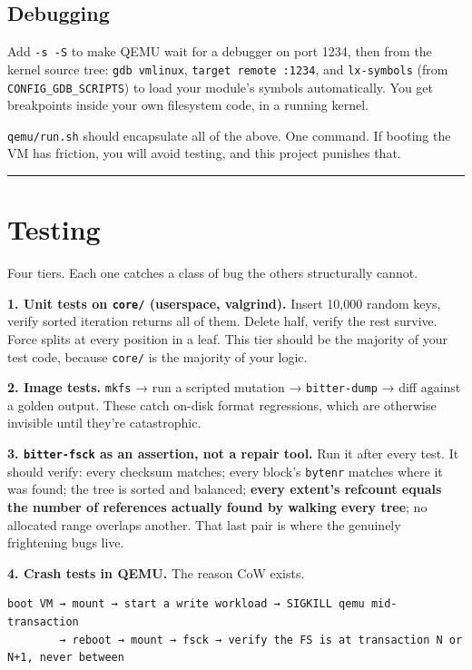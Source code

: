 \hypertarget{debugging}{%
\subsection{Debugging}\label{debugging}}

Add \texttt{-s\ -S} to make QEMU wait for a debugger on port 1234, then from the kernel source
tree: \texttt{gdb\ vmlinux}, \texttt{target\ remote\ :1234}, and \texttt{lx-symbols} (from \texttt{CONFIG\_GDB\_SCRIPTS})
to load your module's symbols automatically. You get breakpoints inside your own
filesystem code, in a running kernel.

\texttt{qemu/run.sh} should encapsulate all of the above. One command. If booting the VM has
friction, you will avoid testing, and this project punishes that.

\begin{center}\rule{0.5\linewidth}{0.5pt}\end{center}

\hypertarget{testing}{%
\section{Testing}\label{testing}}

Four tiers. Each one catches a class of bug the others structurally cannot.

\textbf{1. Unit tests on \texttt{core/} (userspace, valgrind).} Insert 10,000 random keys, verify
sorted iteration returns all of them. Delete half, verify the rest survive. Force splits at
every position in a leaf. This tier should be the majority of your test code, because
\texttt{core/} is the majority of your logic.

\textbf{2. Image tests.} \texttt{mkfs} → run a scripted mutation → \texttt{bitter-dump} → diff against a
golden output. These catch on-disk format regressions, which are otherwise invisible until
they're catastrophic.

\textbf{3. \texttt{bitter-fsck} as an assertion, not a repair tool.} Run it after every test. It should
verify: every checksum matches; every block's \texttt{bytenr} matches where it was found; the tree
is sorted and balanced; \textbf{every extent's refcount equals the number of references actually
found by walking every tree}; no allocated range overlaps another. That last pair is
where the genuinely frightening bugs live.

\textbf{4. Crash tests in QEMU.} The reason CoW exists.

\begin{verbatim}
boot VM → mount → start a write workload → SIGKILL qemu mid-transaction
        → reboot → mount → fsck → verify the FS is at transaction N or N+1, never between
\end{verbatim}

